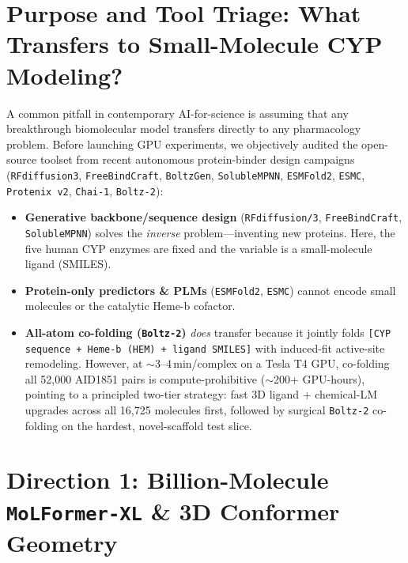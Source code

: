 \documentclass[11pt]{article}
\begin{document}
\section{Purpose and Tool Triage: What Transfers to Small-Molecule CYP Modeling?}
A common pitfall in contemporary AI-for-science is assuming that any breakthrough biomolecular model transfers directly to any pharmacology problem. Before launching GPU experiments, we objectively audited the open-source toolset from recent autonomous protein-binder design campaigns (\texttt{RFdiffusion3}, \texttt{FreeBindCraft}, \texttt{BoltzGen}, \texttt{SolubleMPNN}, \texttt{ESMFold2}, \texttt{ESMC}, \texttt{Protenix v2}, \texttt{Chai-1}, \texttt{Boltz-2}):
\begin{itemize}
  \item \textbf{Generative backbone/sequence design} (\texttt{RFdiffusion/3}, \texttt{FreeBindCraft}, \texttt{SolubleMPNN}) solves the \emph{inverse} problem---inventing new proteins. Here, the five human CYP enzymes are fixed and the variable is a small-molecule ligand (SMILES).
  \item \textbf{Protein-only predictors \& PLMs} (\texttt{ESMFold2}, \texttt{ESMC}) cannot encode small molecules or the catalytic Heme-b cofactor.
  \item \textbf{All-atom co-folding (\texttt{Boltz-2})} \emph{does} transfer because it jointly folds \texttt{[CYP sequence + Heme-b (HEM) + ligand SMILES]} with induced-fit active-site remodeling. However, at $\sim$3--4\,min/complex on a Tesla T4 GPU, co-folding all 52,000 AID1851 pairs is compute-prohibitive ($\sim$200+ GPU-hours), pointing to a principled two-tier strategy: fast 3D ligand + chemical-LM upgrades across all 16,725 molecules first, followed by surgical \texttt{Boltz-2} co-folding on the hardest, novel-scaffold test slice.
\end{itemize}

\section{Direction 1: Billion-Molecule \texttt{MoLFormer-XL} \& 3D Conformer Geometry}
\end{document}
